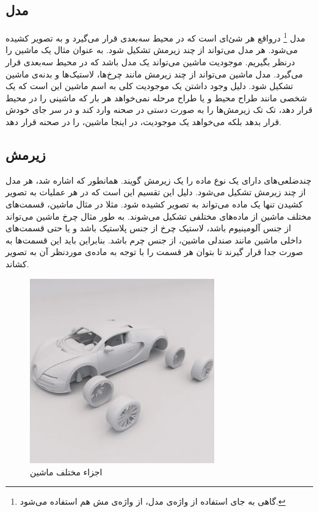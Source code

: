 \subsection{مدل}

مدل‌
\footnote{ گاهی به جای استفاده از واژه‌ی مدل، از واژه‌ی مش هم استفاده می‌شود.}
درواقع هر شئ‌ای است که در محیط سه‌بعدی قرار می‌گیرد و به تصویر کشیده ‌می‌شود. هر مدل می‌تواند از چند زیرمش تشکیل شود.
به عنوان مثال یک ماشین را درنظر بگیریم. موجودیت ماشین می‌تواند یک مدل باشد که در محیط سه‌بعدی قرار می‌گیرد. مدل ماشین می‌تواند از چند زیرمش مانند چرخ‌ها، لاستیک‌ها و بدنه‌ی ماشین تشکیل شود. دلیل وجود داشتن یک موجودیت کلی به اسم ماشین این است که یک ‌شخصی مانند طراح محیط و یا طراح مرحله ‌نمی‌خواهد هر بار که ماشینی را در محیط قرار دهد، تک تک زیرمش‌ها را به صورت دستی در صحنه وارد کند و در سر جای خودش قرار بدهد
بلکه می‌خواهد یک موجودیت، در اینجا ماشین، را در صحنه قرار دهد.


\subsection{زیرمش
\protect{}
}
چندضلعی‌های دارای یک نوع ماده
را یک زیرمش گویند.
همانطور که اشاره شد، هر مدل از چند زیرمش تشکیل می‌شود. دلیل این تقسیم این است که در هر عملیات به تصویر کشیدن
تنها یک ماده می‌تواند به تصویر کشیده شود. مثلا در مثال ماشین، قسمت‌های مختلف ماشین از ماده‌های مختلفی تشکیل می‌شوند. به طور مثال چرخ ماشین می‌تواند از جنس آلومینیوم باشد، لاستیک چرخ از جنس پلاستیک باشد و یا حتی قسمت‌های داخلی ماشین مانند صندلی ماشین، از جنس چرم باشد.
بنابراین باید این قسمت‌ها به صورت جدا قرار گیرند تا بتوان هر قسمت را با توجه به ماده‌ی موردنظر آن به تصویر کشاند.


\begin{figure}[ht]
	\centerline{\includegraphics[width=\textwidth,height=8cm,keepaspectratio]{Figures/Ch2/Car.png}}

	\caption{اجزاء مختلف ماشین\cite{CarSource}}
	\label{fig:Car}
\end{figure}

